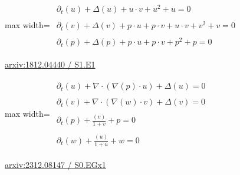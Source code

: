 \documentclass[10pt,a4paper]{article}
\begin{document}
\begin{minipage}{\linewidth}
\begin{center}\begin{adjustbox}{max width=\linewidth}$\displaystyle\begin{gathered}\begin{gathered}\partial_{t}(u)+\Delta(u)+u\cdot v+u^{2}+u=0\end{gathered}\\[5pt]\begin{gathered}\partial_{t}(v)+\Delta(v)+p\cdot u+p\cdot v+u\cdot v+v^{2}+v=0\end{gathered}\\[5pt]\begin{gathered}\partial_{t}(p)+\Delta(p)+p\cdot u+p\cdot v+p^{2}+p=0\end{gathered}\end{gathered}$\end{adjustbox}\end{center}
{\small \href{https://arxiv.org/html/1812.04440#S1.E1}{arxiv:1812.04440 / S1.E1}}\par
\end{minipage}\par\vspace{7mm}

\begin{minipage}{\linewidth}
\begin{center}\begin{adjustbox}{max width=\linewidth}$\displaystyle\begin{gathered}\begin{gathered}\partial_{t}(u)+\nabla\cdot(\nabla(p)\cdot u)+\Delta(u)=0\end{gathered}\\[5pt]\begin{gathered}\partial_{t}(v)+\nabla\cdot(\nabla(w)\cdot v)+\Delta(v)=0\end{gathered}\\[5pt]\begin{gathered}\partial_{t}(p)+\frac{(v)}{1+v}+p=0\end{gathered}\\[5pt]\begin{gathered}\partial_{t}(w)+\frac{(u)}{1+u}+w=0\end{gathered}\end{gathered}$\end{adjustbox}\end{center}
{\small \href{https://arxiv.org/html/2312.08147#S0.EGx1}{arxiv:2312.08147 / S0.EGx1}}\par
\end{minipage}\par\vspace{7mm}
\end{document}
